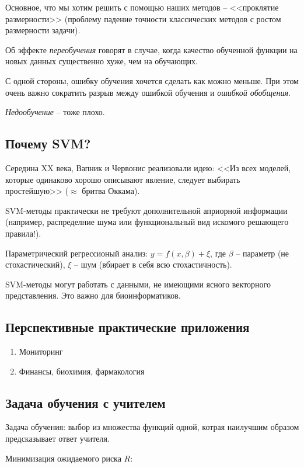 \documentclass[main.tex]{subfiles}
\begin{document}
Основное, что мы хотим решить с помощью наших методов -- <<проклятие размерности>> (проблему падение точности классических методов с ростом размерности задачи).

Об эффекте \emph{переобучения} говорят в случае, когда качество обученной функции на новых данных существенно хуже, чем на обучающих.

С одной стороны, ошибку обучения хочется сделать как можно меньше.
При этом очень важно сократить разрыв между ошибкой обучения и  \emph{ошибкой обобщения}.

\emph{Недообучение} -- тоже плохо.

\subsection{Почему SVM?}

Середина XX века, Вапник и Червонис реализовали идею: <<Из всех моделей, которые одинаково хорошо описывают явление, следует выбирать простейшую>> ($ \approx $ бритва Оккама).

SVM-методы практически не требуют дополнительной априорной информации (например, распределние шума или функциональный вид искомого решающего правила!).

Параметрический регрессионый анализ: $ y = f(x, \beta) + \xi $, где $ \beta $ -- параметр (не стохастический), $ \xi $ -- шум (вбирает в себя всю стохастичность).

SVM-методы могут работать с данными, не имеющими ясного векторного представления.
Это важно для биоинформатиков.

\subsection{Перспективные практические приложения}

\begin{enumerate}[noitemsep]
	\item Мониторинг
	\item Финансы, биохимия, фармакология
\end{enumerate}

\subsection{Задача обучения с учителем}

Задача обучения: выбор из множества функций одной, котрая наилучшим образом предсказывает ответ учителя.

Минимизация ожидаемого риска $ R $:
\end{document}
